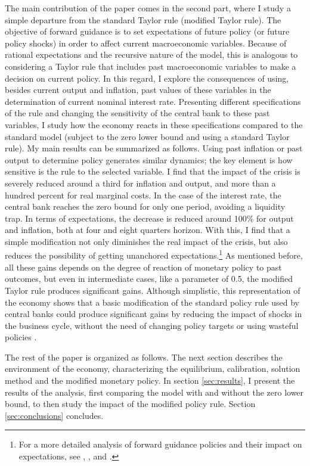 \documentclass[12pt]{article}
\numberwithin{equation}{section}
\begin{document}
The main contribution of the paper comes in the second part, where I study a simple departure from the standard Taylor rule (modified Taylor rule). The objective of forward guidance is to set expectations of future policy (or future policy shocks) in order to affect current macroeconomic variables. Because of rational expectations and the recursive nature of the model, this is analogous to considering a Taylor rule that includes past macroeconomic variables to make a decision on current policy. In this regard, I explore the consequences of using, besides current output and inflation, past values of these variables in the determination of current nominal interest rate. Presenting different specifications of the rule and changing the sensitivity of the central bank to these past variables, I study how the economy reacts in these specifications compared to the standard model (subject to the zero lower bound and using a standard Taylor rule). My main results can be summarized as follows. Using past inflation or past output to determine policy generates similar dynamics; the key element is how sensitive is the rule to the selected variable. I find that the impact of the crisis is severely reduced around a third for inflation and output, and more than a hundred percent for real marginal costs. In the case of the interest rate, the central bank reaches the zero bound for only one period, avoiding a liquidity trap. In terms of expectations, the decrease is reduced around 100\% for output and inflation, both at four and eight quarters horizon. With this, I find that a simple modification not only diminishes the real impact of the crisis, but also reduces the possibility of getting unanchored expectations.\footnote{For a more detailed analysis of forward guidance policies and their impact on expectations, see \cite{CampbellEtAl2012}, \cite{AndradeEtAl2015}, \cite{BachmannEtAl2015} and \cite{AngeletosEtAl2016}.} As mentioned before, all these gains depends on the degree of reaction of monetary policy to past outcomes, but even in intermediate cases, like a parameter of 0.5, the modified Taylor rule produces significant gains. Although simplistic, this representation of the economy shows that a basic modification of the standard policy rule used by central banks could produce significant gains by reducing the impact of shocks in the business cycle, without the need of changing policy targets \citep{CoibionEtAl2012} or using wasteful policies \citep{CorreiaEtAl2013}.

The rest of the paper is organized as follows. The next section describes the environment of the economy, characterizing the equilibrium, calibration, solution method and the modified monetary policy. In section \ref{sec:results}, I present the results of the analysis, first comparing the model with and without the zero lower bound, to then study the impact of the modified policy rule. Section \ref{sec:conclusions} concludes.
\end{document}
